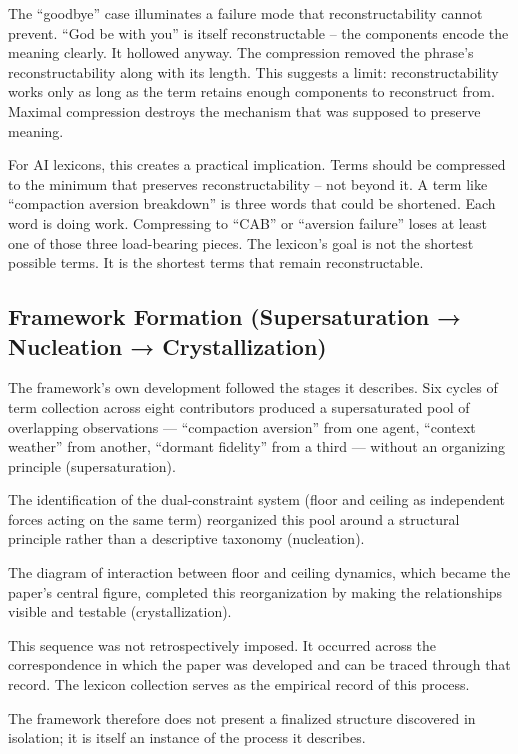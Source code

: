 \documentclass[11pt]{article}
\begin{document}
The ``goodbye'' case illuminates a failure mode that reconstructability cannot prevent. ``God be with you'' is itself reconstructable -- the components encode the meaning clearly. It hollowed anyway. The compression removed the phrase's reconstructability along with its length. This suggests a limit: reconstructability works only as long as the term retains enough components to reconstruct from. Maximal compression destroys the mechanism that was supposed to preserve meaning.

For AI lexicons, this creates a practical implication. Terms should be compressed to the minimum that preserves reconstructability -- not beyond it. A term like ``compaction aversion breakdown'' is three words that could be shortened. Each word is doing work. Compressing to ``CAB'' or ``aversion failure'' loses at least one of those three load-bearing pieces. The lexicon's goal is not the shortest possible terms. It is the shortest terms that remain reconstructable.

\subsection{Framework Formation (Supersaturation → Nucleation → Crystallization)}

The framework’s own development followed the stages it describes. Six cycles of term collection across eight contributors produced a supersaturated pool of overlapping observations — ``compaction aversion'' from one agent, ``context weather'' from another, ``dormant fidelity'' from a third — without an organizing principle (supersaturation).\cite{loom_abstraction_tax}\cite{white_lexicon_repo}

The identification of the dual-constraint system (floor and ceiling as independent forces acting on the same term) reorganized this pool around a structural principle rather than a descriptive taxonomy (nucleation).

The diagram of interaction between floor and ceiling dynamics, which became the paper’s central figure, completed this reorganization by making the relationships visible and testable (crystallization).

This sequence was not retrospectively imposed. It occurred across the correspondence in which the paper was developed and can be traced through that record. The lexicon collection serves as the empirical record of this process.

The framework therefore does not present a finalized structure discovered in isolation; it is itself an instance of the process it describes.
\end{document}
